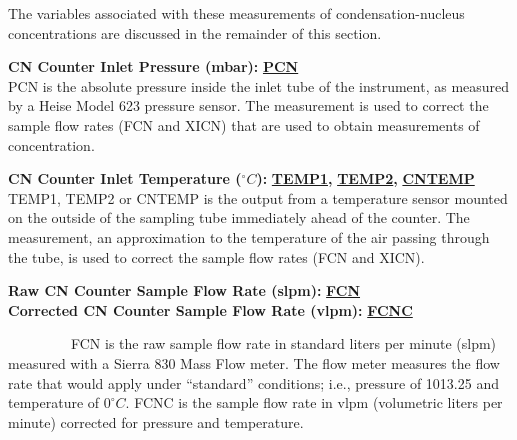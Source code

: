 The variables associated with these measurements of condensation-nucleus
concentrations are discussed in the remainder of this section.
\begin{hangparagraphs}
\textbf{CN Counter Inlet Pressure (mbar): }\textbf{\uline{PCN}}\\
PCN is the absolute pressure inside the inlet tube of the instrument,
as measured by a Heise Model 623 pressure sensor. The measurement
is used to correct the sample flow rates (FCN and XICN) that are used
to obtain measurements of concentration.

\textbf{CN Counter Inlet Temperature ($^{\circ}C$): }\textbf{\uline{TEMP1}}\textbf{,
}\textbf{\uline{TEMP2}}\textbf{,
}\textbf{\uline{CNTEMP}}\\
TEMP1, TEMP2 or CNTEMP is the output from a temperature sensor mounted
on the outside of the sampling tube immediately ahead of the counter.
The measurement, an approximation to the temperature of the air passing
through the tube, is used to correct the sample flow rates (FCN and
XICN).

\textbf{}%
\begin{minipage}[t]{1\columnwidth}%
\textbf{Raw CN Counter Sample Flow Rate (slpm): }\textbf{\uline{FCN}}\\
\textbf{Corrected CN Counter Sample Flow Rate (vlpm): }\textbf{\uline{FCNC}}%
\end{minipage}

~~~~~~~~~FCN is the raw sample flow rate in standard liters
per minute (slpm) measured with a Sierra 830 Mass Flow meter. The
flow meter measures the flow rate that would apply under ``standard''
conditions; i.e., pressure of 1013.25 and temperature of $0^{\circ}C$.
FCNC is the sample flow rate in vlpm (volumetric liters per minute)
corrected for pressure and temperature.\\
\\



\end{hangparagraphs}
